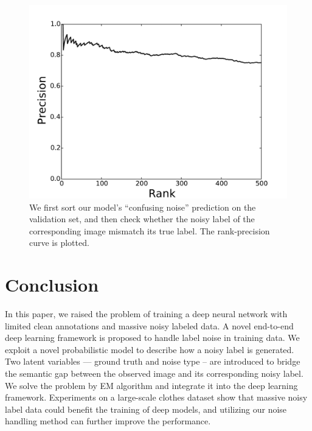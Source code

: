 \documentclass[10pt,twocolumn,letterpaper]{article}
\begin{document}
\begin{figure}[t]
\begin{center}
\includegraphics[width=0.8\linewidth]{figure/noise_prediction_rank_precision.pdf}
\end{center}
\caption{We first sort our model's ``confusing noise'' prediction on the validation set, and then check whether the noisy label of the corresponding image mismatch its true label. The rank-precision curve is plotted.}
\label{fig:noise_prediction_rp}
\end{figure}

\section{Conclusion} %
\label{sec:conclusion}
In this paper, we raised the problem of training a deep neural network with limited clean annotations and massive noisy labeled data. A novel end-to-end deep learning framework is proposed to handle label noise in training data. We exploit a novel probabilistic model to describe how a noisy label is generated. Two latent variables --- ground truth and noise type -- are introduced to bridge the semantic gap between the observed image and its corresponding noisy label. We solve the problem by EM algorithm and integrate it into the deep learning framework. Experiments on a large-scale clothes dataset show that massive noisy label data could benefit the training of deep models, and utilizing our noise handling method can further improve the performance.

{\small


}
\end{document}
